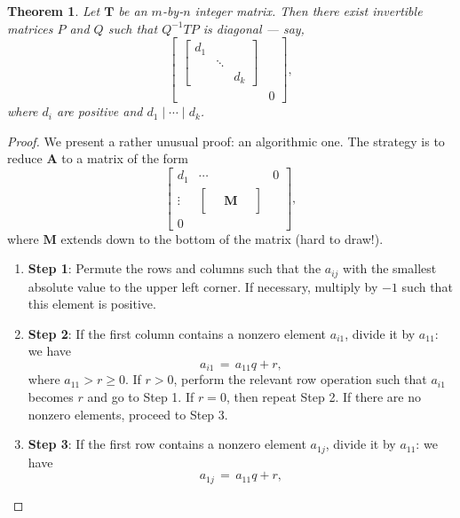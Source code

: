 \documentclass[11pt]{article}
\newtheorem{theorem}{Theorem}
\newcommand{\mat}[1]{\mathbf{#1}}
\begin{document}
\begin{adjustwidth}{0.5cm}{}
  \begin{theorem}
    Let $\mat{T}$ be an $m$-by-$n$ integer matrix. Then there exist invertible matrices $P$ and $Q$ such that $Q^{-1}TP$ is diagonal --- say,
    \[
      \begin{bmatrix} \begin{bmatrix} d_{1} & \, & \, \\ \, & \ddots & \, \\ \, & \, & d_{k} \end{bmatrix}  & \, \\ \, & 0 \end{bmatrix},
    \]
    where $d_{i}$ are positive and $d_{1} \mid \cdots \mid d_{k}$.
  \end{theorem}
  \newpage
  \begin{proof}
    We present a rather unusual proof: an algorithmic one. The strategy is to reduce $\mat{A}$ to a matrix of the form
    \begin{equation}
      \begin{bmatrix} d_{1} & \cdots & 0 \\ \vdots & \begin{bmatrix} \, & \, & \, \\ \, & \mat{M} & \, \\ \, \end{bmatrix} \\ 0 \end{bmatrix},
    \end{equation}
    where $\mat{M}$ extends down to the bottom of the matrix (hard to draw!).
    \begin{enumerate}
      \item \textbf{Step 1}: Permute the rows and columns such that the $a_{ij}$ with the smallest absolute value to the upper left corner. If necessary, multiply by $-1$ such that this element is positive.
      \item \textbf{Step 2}: If the first column contains a nonzero element $a_{i1}$, divide it by $a_{11}$: we have
      \[
        a_{i1} \, = \, a_{11}q + r,
      \]
      where $a_{11} > r \ge 0$. If $r > 0$, perform the relevant row operation such that $a_{i1}$ becomes $r$ and go to Step 1. If $r = 0$, then repeat Step 2. If there are no nonzero elements, proceed to Step 3.
      \item \textbf{Step 3}: If the first row contains a nonzero element $a_{1j}$, divide it by $a_{11}$: we have
      \[
        a_{1j} \, = \, a_{11}q + r,
\]
\end{enumerate}
\end{proof}
\end{adjustwidth}
\end{document}
